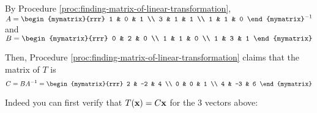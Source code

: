 \begin{solution}
By Procedure \ref{proc:finding-matrix-of-linear-transformation}, 
$A=  \begin{mymatrix}{rrr}
1 & 0 & 1 \\
3 & 1 & 1 \\
1 & 1 & 0
\end{mymatrix} ^{-1}$ and 
 $B=\begin{mymatrix}{rrr}
0 & 2 & 0 \\
1 & 1 & 0 \\
1 & 3 & 1
\end{mymatrix}$

Then, Procedure \ref{proc:finding-matrix-of-linear-transformation} claims that the matrix of $T$ is 
\begin{equation*}
C= BA^{-1} 
=\begin{mymatrix}{rrr}
2 & -2 & 4 \\
0 & 0 & 1 \\
4 & -3 & 6
\end{mymatrix}
\end{equation*}

Indeed you can first verify that $T(\mbox{\bf x})=C\mbox{\bf x}$ for the 3 vectors above:


\end{solution}
